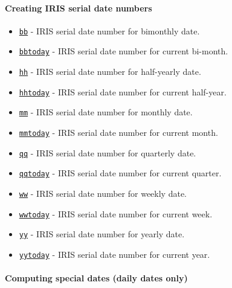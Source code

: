 

	\paragraph{Creating IRIS serial date
numbers}\label{creating-iris-serial-date-numbers}

\begin{itemize}
\itemsep1pt\parskip0pt
\item
  \href{dates/bb}{\texttt{bb}} - IRIS serial date number for bimonthly
  date.
\item
  \href{dates/bbtoday}{\texttt{bbtoday}} - IRIS serial date number for
  current bi-month.
\item
  \href{dates/hh}{\texttt{hh}} - IRIS serial date number for half-yearly
  date.
\item
  \href{dates/hhtoday}{\texttt{hhtoday}} - IRIS serial date number for
  current half-year.
\item
  \href{dates/mm}{\texttt{mm}} - IRIS serial date number for monthly
  date.
\item
  \href{dates/mmtoday}{\texttt{mmtoday}} - IRIS serial date number for
  current month.
\item
  \href{dates/qq}{\texttt{qq}} - IRIS serial date number for quarterly
  date.
\item
  \href{dates/qqtoday}{\texttt{qqtoday}} - IRIS serial date number for
  current quarter.
\item
  \href{dates/ww}{\texttt{ww}} - IRIS serial date number for weekly
  date.
\item
  \href{dates/wwtoday}{\texttt{wwtoday}} - IRIS serial date number for
  current week.
\item
  \href{dates/yy}{\texttt{yy}} - IRIS serial date number for yearly
  date.
\item
  \href{dates/yytoday}{\texttt{yytoday}} - IRIS serial date number for
  current year.
\end{itemize}

\paragraph{Computing special dates (daily dates
only)}\label{computing-special-dates-daily-dates-only}

